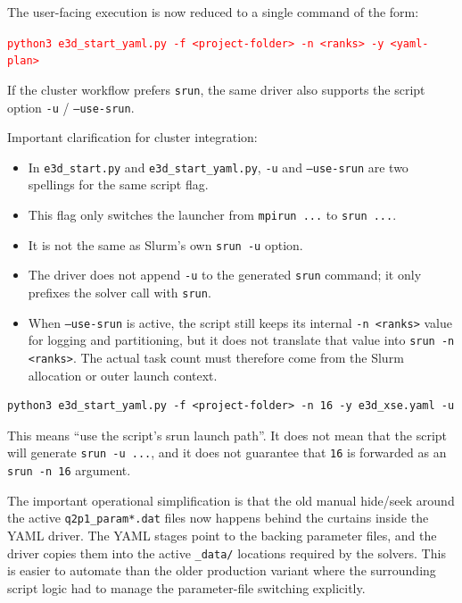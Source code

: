 \documentclass[11pt,a4paper]{article}
\begin{document}
The user-facing execution is now reduced to a single command of the form:

\begin{flushleft}
\textcolor{red}{\texttt{python3 e3d\_start\_yaml.py -f <project-folder> -n <ranks> -y <yaml-plan>}}
\end{flushleft}

If the cluster workflow prefers \texttt{srun}, the same driver also supports the script option
\texttt{-u} / \texttt{--use-srun}.

Important clarification for cluster integration:

\begin{itemize}[leftmargin=*]
  \item In \texttt{e3d\_start.py} and \texttt{e3d\_start\_yaml.py}, \texttt{-u} and
  \texttt{--use-srun} are two spellings for the same script flag.
  \item This flag only switches the launcher from \texttt{mpirun ...} to \texttt{srun ...}.
  \item It is not the same as Slurm's own \texttt{srun -u} option.
  \item The driver does not append \texttt{-u} to the generated \texttt{srun}
  command; it only prefixes the solver call with \texttt{srun}.
  \item When \texttt{--use-srun} is active, the script still keeps its internal
  \texttt{-n <ranks>} value for logging and partitioning, but it does not translate that value into
  \texttt{srun -n <ranks>}. The actual task count must therefore come from the Slurm allocation or
  outer launch context.
\end{itemize}

\begin{verbatim}
python3 e3d_start_yaml.py -f <project-folder> -n 16 -y e3d_xse.yaml -u
\end{verbatim}

This means ``use the script's srun launch path''. It does not mean that the script
will generate \texttt{srun -u ...}, and it does not guarantee that \texttt{16} is forwarded as an
\texttt{srun -n 16} argument.

The important operational simplification is that the old manual hide/seek around the active
\texttt{q2p1\_param*.dat} files now happens behind the curtains inside the YAML driver. The YAML stages point to the
backing parameter files, and the driver copies them into the active \texttt{\_data/} locations required by the
solvers. This is easier to automate than the older production variant where the surrounding script logic had to
manage the parameter-file switching explicitly.
\end{document}
